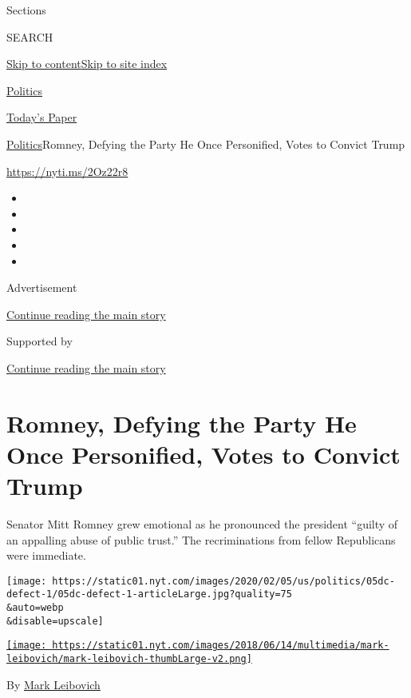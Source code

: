 Sections

SEARCH

\protect\hyperlink{site-content}{Skip to
content}\protect\hyperlink{site-index}{Skip to site index}

\href{https://www.nytimes.com/section/politics}{Politics}

\href{https://myaccount.nytimes.com/auth/login?response_type=cookie\&client_id=vi}{}

\href{https://www.nytimes.com/section/todayspaper}{Today's Paper}

\href{/section/politics}{Politics}\textbar{}Romney, Defying the Party He
Once Personified, Votes to Convict Trump

\url{https://nyti.ms/2Oz22r8}

\begin{itemize}
\item
\item
\item
\item
\item
\end{itemize}

Advertisement

\protect\hyperlink{after-top}{Continue reading the main story}

Supported by

\protect\hyperlink{after-sponsor}{Continue reading the main story}

\hypertarget{romney-defying-the-party-he-once-personified-votes-to-convict-trump}{%
\section{Romney, Defying the Party He Once Personified, Votes to Convict
Trump}\label{romney-defying-the-party-he-once-personified-votes-to-convict-trump}}

Senator Mitt Romney grew emotional as he pronounced the president
``guilty of an appalling abuse of public trust.'' The recriminations
from fellow Republicans were immediate.

\texttt{[image: https://static01.nyt.com/images/2020/02/05/us/politics/05dc-defect-1/05dc-defect-1-articleLarge.jpg?quality=75\\\&auto=webp\\\&disable=upscale]}

\href{https://www.nytimes.com/by/mark-leibovich}{\texttt{[image: https://static01.nyt.com/images/2018/06/14/multimedia/mark-leibovich/mark-leibovich-thumbLarge-v2.png]}}

By \href{https://www.nytimes.com/by/mark-leibovich}{Mark Leibovich}

